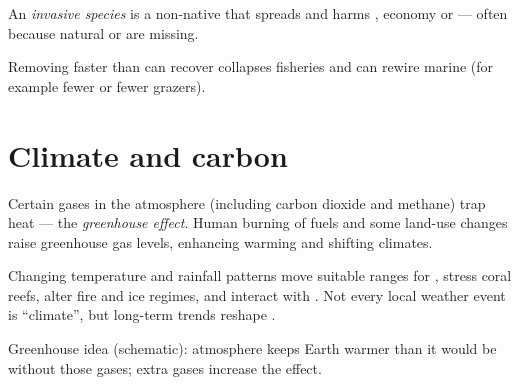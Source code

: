 \begin{definition}\label{def:g7:impact:invasive}
An \emph{invasive species} is a non-native 
that spreads and harms , economy or  --- often because
natural  or  are missing.
\end{definition}

\begin{example}[Overfishing]\label{ex:g7:impact:fish}
Removing  faster than  can recover collapses fisheries and
can rewire marine  (for example fewer  or fewer grazers).
\end{example}

\section{Climate and carbon}

\begin{definition}\label{def:g7:impact:ghg}
Certain gases in the atmosphere (including carbon dioxide and methane)
trap heat --- the \emph{greenhouse effect}. Human
burning of  fuels and some land-use changes raise greenhouse gas
levels, enhancing warming and shifting climates.
\end{definition}

\begin{proposition}\label{prop:g7:impact:climate}
Changing temperature and rainfall patterns move suitable ranges for
, stress coral reefs, alter fire and ice regimes, and interact with
. Not every local weather event is ``climate'', but long-term
trends reshape .
\end{proposition}
\admitted

\begin{omfigure}

{\small Greenhouse idea (schematic): atmosphere keeps Earth warmer than
it would be without those gases; extra gases increase the effect.}
\end{omfigure}

